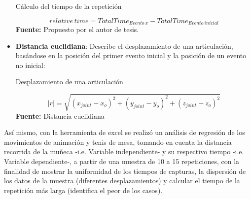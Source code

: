 \begin{itemize}
\begin{formula}[H]
	\centering
	\caption{C\'alculo del tiempo de la repetici\'on}
	\label{frm:relativeTime}
	\begin{equation}
	relative \: time = TotalTime_{Evento\: x}-TotalTime_{Evento\: inicial}
	\end{equation}
		\textbf{Fuente:} Propuesto por el autor de tesis.
\end{formula}
\item \textbf{Distancia euclidiana}: Describe el desplazamiento de una articulaci\'on, bas\'andose en la posici\'on del primer evento inicial y la posici\'on de un evento no inicial:
\begin{formula}[H]
	\centering
	\caption{Desplazamiento de una articulaci\'on}
	\label{frm:desplazaUser}
	\begin{equation}
|r|=\sqrt{(x_{joint}-x_{o})^{2}+(y_{joint}-y_{o})^{2}+(z_{joint}-z_{o})^{2}}
	\end{equation}
	\textbf{Fuente:} Distancia euclidiana \cite[p.~423]{ayres2001calculo}
\end{formula}  
\end{itemize}
As\'i mismo, con la herramienta de excel se realiz\'o un an\'alisis de regresi\'on  de los movimientos de animaci\'on y tenis de mesa, tomando en cuenta  la distancia recorrida de la mu\~neca -i.e. Variable independiente- y su respectivo tiempo -i.e. Variable dependiente-, a partir de una muestra de 10 a 15 repeticiones, con la finalidad de mostrar la uniformidad de los tiempos de capturas, la dispersi\'on de los datos de la muestra (diferentes desplazamientos) y calcular el tiempo de la repetici\'on m\'as larga (identifica el peor de los casos).
